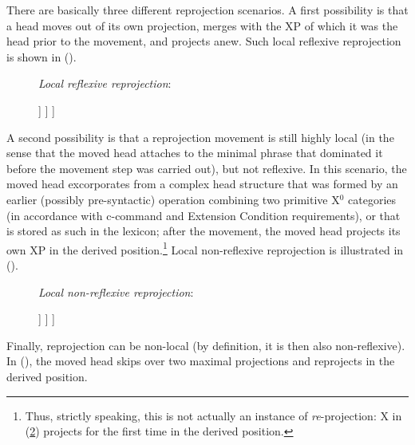 \documentclass[output=paper
,modfonts
,nonflat]{langsci/langscibook}
\begin{document}
	There are basically three different reprojection scenarios. A first
	possibility is that a head moves out of its own projection, merges
	with the XP of which it was the head prior to the movement, and
	projects anew. Such local reflexive reprojection is shown in (\Next). 

	\begin{figure}[!h]
		\begin{exe}
			\ex	\label{ex:mueller:24} {\textit{Local reflexive reprojection}}:\\
				\begin{forest}	
					[XP
					[X\sub{1}]
					[XP
					[WP]
					[X$'$
					[t\sub{1}]
					[ZP]
					] ] ] 	
			\end{forest}
		\end{exe} \vspace{-1.1cm}
	\end{figure}
	\newpage \noindent A second possibility is that a reprojection movement is still highly
	local (in the sense that the moved head attaches to the minimal phrase
	that dominated it before the movement step was carried out), but not
	reflexive. In this scenario, the moved head excorporates from a complex
	head structure that was formed by an earlier (possibly pre-syntactic) 
	operation combining two primitive X$^0$ categories (in accordance with
	c-command and Extension Condition requirements), or that is stored as
	such in the lexicon; after the movement, the moved head projects its own
	XP in the derived position.\footnote{Thus, strictly speaking, this is
		not actually an instance of {\itshape re}-projection: X in (\ref{aux12})
		projects for the first time in the derived position.} Local non-reflexive
	reprojection is illustrated in (\Next). 
	\begin{figure}[!h]
		\begin{exe}
			\ex	\label{ex:mueller:25} {\textit{Local \label{aux12}non-reflexive reprojection}}:\\
				\begin{forest}	
					[XP
					[X\sub{1}]
					[YP
					[WP]
					[Y$'$
					[Y-t\sub{1}]
					[ZP]
					] ] ] 	
			\end{forest}
		\end{exe} \vspace{-0.8cm}
	\end{figure}
\newline	Finally, reprojection can be non-local (by definition, it is then also
	non-reflexive). In (\Next), the moved head skips over two maximal
	projections and reprojects in the derived position. 
	
\end{document}

